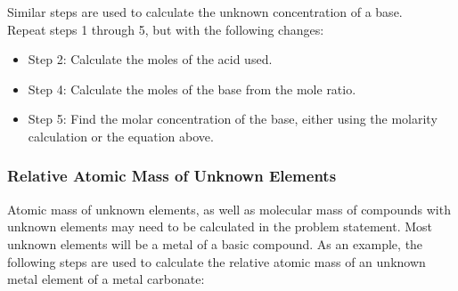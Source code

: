 Similar steps are used to calculate the unknown concentration of a base.\\
Repeat steps 1 through 5, but with the following changes:\\
\begin{itemize}[topsep=0ex,itemsep=0ex,partopsep=1ex,parsep=1ex]
\item{Step 2: Calculate the moles of the acid used.}
\item{Step 4: Calculate the moles of the base from the mole ratio.}
\item{Step 5: Find the molar concentration of the base, either using the molarity calculation or the equation above.}
\end{itemize}

\subsubsection{Relative Atomic Mass of Unknown Elements}

Atomic mass of unknown elements, as well as molecular mass of compounds with unknown elements may need to be calculated in the problem statement. Most unknown elements will be a metal of a basic compound. As an example, the following steps are used to calculate the relative atomic mass of an unknown metal element of a metal carbonate:

